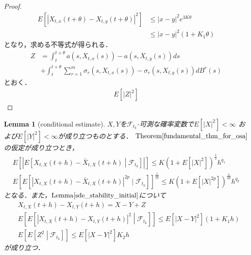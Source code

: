 \documentclass[dvipdfmx,autodetect-engine]{jsarticle}
\newtheorem{lemma}[theorem]{Lemma}
\theoremstyle{remark}
\theoremstyle{definition}
\newcommand{\abs}[1]{\left\lvert#1\right\rvert}
\newcommand{\setmid}{\mathrel{} \middle| \mathrel{}}
\begin{document}
\begin{proof}
\begin{align}
        E[\abs{X_{t,x}(t+\theta)-X_{t,y}(t+\theta)}^{2}]
        &\leq \abs{x-y}^{2} e^{3K \theta }\\
        &\leq \abs{x-y}^{2} (1+K_{1}\theta)
    \end{align}
    となり，求める不等式が得られる．
    \begin{align}
        Z &= \int_{t}^{t+\theta} a(s,X_{t,x}(s))-a(s,X_{t,y}(s)) ds \\
        &+ \int_{t}^{t+\theta} \sum_{r=1}^{m} 
        \sigma_{r}(s,X_{t,x}(s))-\sigma_{r}(s,X_{t,y}(s)) dB^{r}(s)
    \end{align}
    とおく．
    \begin{align}
        E[\abs{Z}^{2}]
    \end{align}
\end{proof}


\begin{lemma}[conditional estimate]
    $X,Y$を$\mathcal{F}_{t_{k}}$-可測な確率変数で$E[\abs{X}^{2}]<\infty$
    および$E[\abs{Y}^{2}]<\infty$が成り立つものとする．
    $\mathrm{Theorem}\ref{fundamental_thm_for_osa}$の仮定が成り立つとき，
    \begin{align}
        E\left[ \abs{ 
            E [ 
                X_{t,X}(t+h) - \bar{X}_{t,X}(t+h) \setmid \mathcal{F}_{t_{k}} 
            ] 
            } 
        \right]
        \leq K(
            1+E[
            \abs{X}^{2}
            ]
            )^{\frac{1}{2}} h^{q_{1}} \\
        E\left[ 
            E[
                \abs{ X_{t,X}(t+h)- \bar{X}_{t,X}(t+h) }^{2p}
            \mid \mathcal{F}_{t_{k}}
        ]
        \right]^{\frac{1}{2p}}
        \leq K(1+E[\abs{X}^{2p}])^{\frac{1}{2p}} h^{q_{2}}
    \end{align}
    となる．また，$\mathrm{Lemma}\ref{sde_stability_initial}$について
    \begin{align}
        &X_{t,X}(t+h) - X_{t,Y}(t+h) = X-Y + Z \\
        &E\left[
            E[
                \abs{
                    X_{t,X}(t+h) - X_{t,Y}(t+h) 
                }^{2}
                \setmid \mathcal{F}_{t_{k}}
            ]
        \right]
        \leq
        E[
            \abs{X-Y}^{2}
        ]
        (1+K_{1}h) \\
        &E\left[
            E[
                Z^{2} \setmid \mathcal{F}_{t_{k}}
            ]
        \right]
        \leq
        E[
            \abs{X-Y}^{2}
        ] K_{2}h
    \end{align}
    が成り立つ．
\end{lemma}
\end{document}
